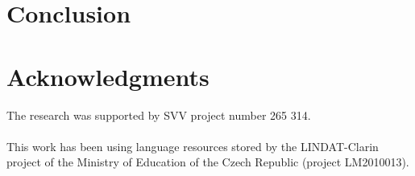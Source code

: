 \documentclass{llncs}
\begin{document}


\section{Conclusion}

\section*{Acknowledgments}

The research was supported by SVV project number 265 314.\\
\\
This work has been using language resources stored
by the LINDAT-Clarin project of the Ministry of
Education of the Czech Republic (project LM2010013).
%


\end{document}
